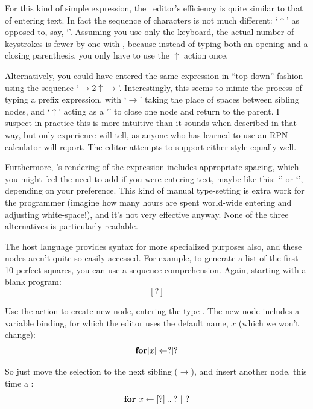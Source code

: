 For this kind of simple expression, the \Meta\ editor's efficiency is quite similar to that of entering text. In fact the sequence of characters is not much different: `$\uparrow$' as opposed to, say, `'. Assuming you use only the keyboard, the actual number of keystrokes is fewer by one with \Meta, because instead of typing both an opening and a closing parenthesis, you only have to use the $\uparrow$ action once.

Alternatively, you could have entered the same expression in ``top-down'' fashion using the sequence `$\rightarrow${2}$\uparrow\rightarrow$'. Interestingly, this seems to mimic the process of typing a prefix expression, with `$\rightarrow$' taking the place of spaces between sibling nodes, and `$\uparrow$' acting as a '\clojure{)}' to close one node and return to the parent. I suspect in practice this is more intuitive than it sounds when described in that way, but only experience will tell, as anyone who has learned to use an RPN calculator will report. The editor attempts to support either style equally well.

Furthermore, \Meta's rendering of the expression includes appropriate spacing, which you might feel the need to add if you were entering text, maybe like this: `' or `', depending on your preference. This kind of manual type-setting is extra work for the programmer (imagine how many hours are spent world-wide entering and adjusting white-space!), and it's not very effective anyway. None of the three alternatives is particularly readable.

\vspace{12pt}

The host language provides syntax for more specialized purposes also, and these nodes aren't quite so easily accessed. For example, to generate a list of the first 10 perfect squares, you can use a sequence comprehension. Again, starting with a blank program:
$$[?]$$

Use the  action to create new node, entering the type . The new node includes a variable binding, for which the editor uses the default name, $x$ (which we won't change):
$$\textbf{for} [x] \leftarrow ? | ?$$

So just move the selection to the next sibling ($\rightarrow$), and insert another node, this time a :
$$\textbf{for} \  x \leftarrow [?] \: .. \: ? \ | \ ?$$

